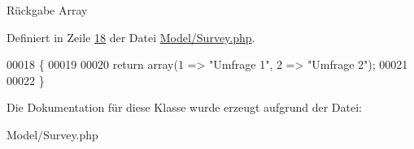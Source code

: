 \begin{DoxyReturn}{Rückgabe}
Array 
\end{DoxyReturn}


Definiert in Zeile \hyperlink{_model_2_survey_8php_source_l00018}{18} der Datei \hyperlink{_model_2_survey_8php_source}{Model/\-Survey.\-php}.


\begin{DoxyCode}
00018                                      \{
00019                 
00020                 \textcolor{keywordflow}{return} array(1 => \textcolor{stringliteral}{"Umfrage 1"}, 2 => \textcolor{stringliteral}{"Umfrage 2"});
00021                 
00022         \}
\end{DoxyCode}


Die Dokumentation für diese Klasse wurde erzeugt aufgrund der Datei\-:\begin{DoxyCompactItemize}
\item 
Model/\-Survey.\-php\end{DoxyCompactItemize}
